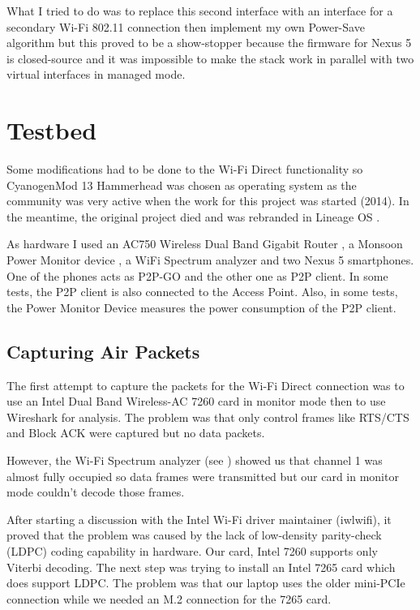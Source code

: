 What I tried to do was to replace this second interface with an interface for a secondary Wi-Fi 802.11 connection then implement my own Power-Save algorithm but this proved to be a show-stopper because the firmware for Nexus 5 is closed-source and it was impossible to make the stack work in parallel with two virtual interfaces in managed mode.


\section{Testbed}
\label{sec:testbed}

Some modifications had to be done to the Wi-Fi Direct functionality so CyanogenMod 13 Hammerhead was chosen as operating system as the community was very active when the work for this project was started (2014). In the meantime, the original project died and was rebranded in Lineage OS \cite{cite-lineage}.

As hardware I used an AC750 Wireless Dual Band Gigabit Router \cite{cite-router}, a Monsoon Power Monitor device \cite{cite-monsoon}, a WiFi Spectrum analyzer and two Nexus 5 smartphones. One of the phones acts as P2P-GO and the other one as P2P client. In some tests, the P2P client is also connected to the Access Point. Also, in some tests, the Power Monitor Device measures the power consumption of the P2P client.

\subsection{Capturing Air Packets}
\label{sub-sec:proj-scopemonitormode}

The first attempt to capture the packets for the Wi-Fi Direct connection was to use an Intel Dual Band Wireless-AC 7260 card \cite{cite-intel7260} in monitor mode then to use Wireshark \cite{cite-wireshark}  for analysis. The problem was that only control frames like RTS/CTS and Block ACK were captured but no data packets.

However, the Wi-Fi Spectrum analyzer (see ) showed us that channel 1 was almost fully occupied so data frames were transmitted but our card in monitor mode couldn't decode those frames.


After starting a discussion \cite{cite-monitordiscussion} with the Intel Wi-Fi driver maintainer (iwlwifi), it proved that the problem was caused by the lack of low-density parity-check (LDPC) coding capability in hardware. Our card, Intel 7260 supports only Viterbi decoding. The next step was trying to install an Intel 7265 card which does support LDPC. The problem was that our laptop uses the older mini-PCIe connection while we needed an M.2 connection for the 7265 card.

